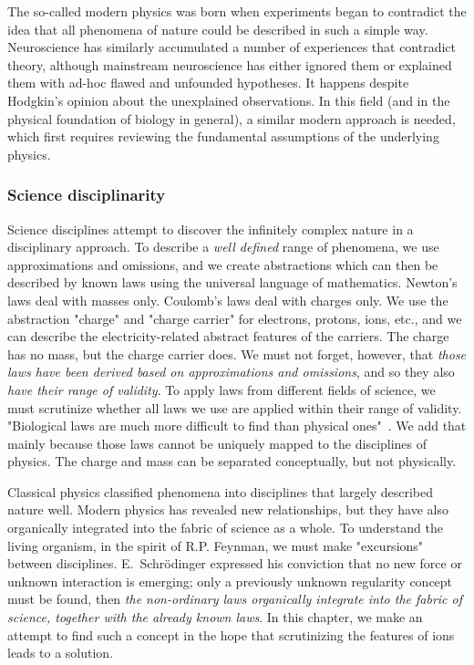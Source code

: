 The so-called modern physics was born when experiments began to contradict the idea that all phenomena of nature could be described in such a simple way.
Neuroscience has similarly accumulated a number of experiences that contradict theory, although mainstream neuroscience has either ignored them or explained them with ad-hoc flawed and unfounded hypotheses.
It happens despite Hodgkin's opinion about the %
{unexplained observations}.
In this field (and in the physical foundation of biology in general), a similar modern approach is needed, which first requires reviewing the fundamental assumptions of the underlying physics.


\subsubsection[Disciplinarity]{Science disciplinarity\label{sec:Physics-ScienceDisciplinarity}}

Science disciplines attempt to discover the infinitely complex nature  
in a \hypertarget{disciplinarity}{disciplinary approach}.
To describe a \textit{well defined} range of phenomena, we use approximations and omissions,
and we create \hypertarget{Abstractions}{abstractions} which can then be described by known laws using
the universal language of mathematics.
Newton's laws deal with masses only. Coulomb's laws deal with charges only.
We use the abstraction "charge"
and "charge carrier" for electrons, protons, ions, etc., and we can describe the
electricity-related abstract features of the carriers.
The charge has no mass, but the charge carrier does.
We must not forget, however, that \textit{those laws have been
derived based on approximations and omissions}, and so they also \textit{have
their range of validity}. To apply laws from different fields of science,
we must scrutinize whether all laws we use are applied within their range of validity. 
 "Biological laws are much more difficult to find than physical ones"~\cite{VollmerLimitsOfBiology:1995}.
We add that mainly because those laws cannot be uniquely mapped
to the disciplines of physics. The charge and mass can be separated conceptually, but not physically.


Classical physics classified phenomena into disciplines that largely described nature well.
Modern physics has revealed new relationships, but they have also organically integrated into the fabric of science as a whole.
To understand the living organism, in the spirit of R.P. Feynman, we must make "excursions" between disciplines. 
E.~Schrödinger expressed his conviction that no new force or unknown interaction is emerging;
only a previously unknown regularity concept must be found,
then \textit{the non-ordinary laws organically integrate into the fabric of science, together with the already known laws}.
In this chapter, we make an attempt to find such a concept in the hope that scrutinizing
the features of ions leads to a solution.
 

